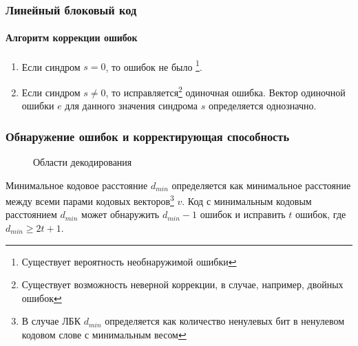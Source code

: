 \begin{frame}
    \frametitle{Линейный блоковый код}
    \framesubtitle{Алгоритм коррекции ошибок}

    \begin{enumerate}
        \item Если синдром $s=0$, то ошибок не было
            \footnote{Существует вероятность необнаружимой ошибки}.
        \item Если синдром $s\neq 0$, то исправляется\footnote{Существует возможность неверной коррекции, в случае, например, двойных ошибок} одиночная ошибка. Вектор одиночной ошибки $e$ для данного значения синдрома $s$ определяется однозначно.
    \end{enumerate}
\end{frame}


\begin{frame}
    \frametitle{Обнаружение ошибок и корректирующая способность}
    
    \begin{figure}
        \begin{center}
            \caption{Области декодирования}\label{pict:dmin}
        \end{center}
    \end{figure} 
    \alert{Минимальное кодовое расстояние} $d_{min}$ определяется как минимальное расстояние между всеми парами кодовых векторов\footnote{В случае ЛБК $d_{min}$ определяется как количество ненулевых бит в ненулевом кодовом слове с минимальным весом} $v$. Код с минимальным кодовым расстоянием $d_{min}$ может \alert{обнаружить} $d_{min}-1$ ошибок и \alert{исправить} $t$ ошибок, где $d_{min}\geq 2t + 1$.
\end{frame}


